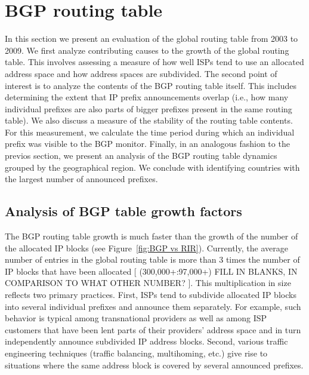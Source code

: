 \section{BGP routing table}
\label{sec:bgp}

In this section we present an evaluation of the global routing table from 2003
to 2009. We first analyze contributing causes to the growth of the global routing table. This involves assessing a measure of how well ISPs
tend to use an allocated address space and how address spaces are
subdivided. The second point of interest is to analyze the contents of the BGP
routing table itself. This includes determining the extent that IP prefix announcements overlap (i.e., how many individual prefixes are
also parts of bigger prefixes present in the same routing table). We also discuss a measure of the stability of the routing table contents. For this measurement, we calculate
the time period during which an individual prefix was visible to the
BGP monitor. Finally, in an analogous fashion to the previos section, we present an analysis of the BGP routing table
dynamics grouped by the geographical region.  We conclude with identifying  countries with the
largest number of announced prefixes.

\subsection{Analysis of BGP table growth factors}

The BGP routing table growth is much faster than the growth of the number of
the allocated IP blocks (see Figure~\ref{fig:BGP vs RIR}). Currently, the
average number of entries in the global routing table is more than 3 times
the number of IP blocks that have been allocated [ (300,000+:97,000+) FILL IN BLANKS, IN COMPARISON TO WHAT OTHER NUMBER? ]. This multiplication in size reflects two primary practices. First, ISPs tend to subdivide allocated IP blocks into several
individual prefixes and announce them separately. For example, such behavior
is typical among transnational providers as well as among ISP customers that have been lent parts of their providers' address space and in turn independently announce subdivided IP address blocks. Second, various traffic
engineering techniques (traffic balancing, multihoming, etc.) give rise to situations
where the same address block is covered by several announced prefixes.

